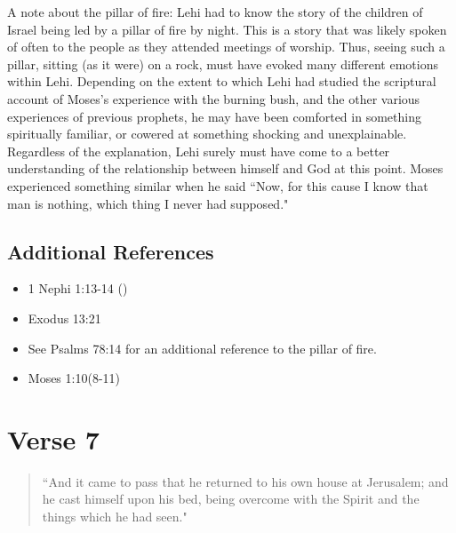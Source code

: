 \documentclass[12pt]{report}
\begin{document}
A note about the pillar of fire: Lehi had to know the story of the children of Israel being led by a pillar of fire by night. This is a story that was likely spoken of often to the people as they attended meetings of worship.  Thus, seeing such a pillar, sitting (as it were) on a rock, must have evoked many different emotions within Lehi.  Depending on the extent to which Lehi had studied the scriptural account of Moses's experience with the burning bush, and the other various experiences of previous prophets, he may have been comforted in something spiritually familiar, or cowered at something shocking and unexplainable.  Regardless of the explanation, Lehi surely must have come to a better understanding of the relationship between himself and God at this point.  Moses experienced something similar when he said ``Now, for this cause I know that man is nothing, which thing I never had supposed."

\subsection{Additional References\label{1Nephi1:6:references}}
\begin{itemize}
\item 1 Nephi 1:13-14 ()
\item Exodus 13:21
\item See Psalms 78:14 for an additional reference to the pillar of fire.
\item Moses 1:10(8-11)
\end{itemize}

\section{Verse 7\label{1Nephi1:7}}
\begin{center}
\begin{quote}
``And it came to pass that he returned to his own house at Jerusalem; and he cast himself upon his bed, being overcome with the Spirit and the things which he had seen."
\end{quote}
\end{center}
\end{document}
